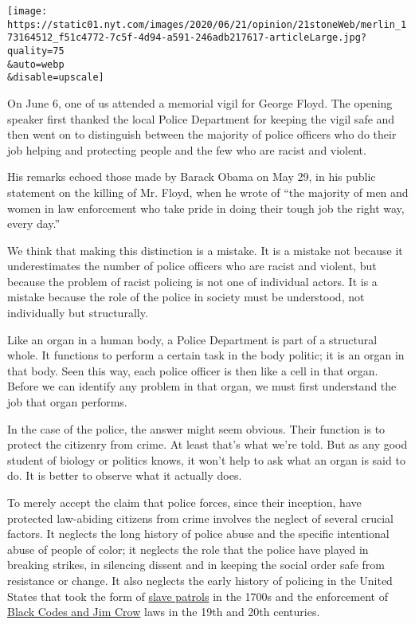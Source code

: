 \texttt{[image: https://static01.nyt.com/images/2020/06/21/opinion/21stoneWeb/merlin\_173164512\_f51c4772-7c5f-4d94-a591-246adb217617-articleLarge.jpg?quality=75\\\&auto=webp\\\&disable=upscale]}

On June 6, one of us attended a memorial vigil for George Floyd. The
opening speaker first thanked the local Police Department for keeping
the vigil safe and then went on to distinguish between the majority of
police officers who do their job helping and protecting people and the
few who are racist and violent.

His remarks echoed those made by Barack Obama on May 29, in his public
statement on the killing of Mr. Floyd, when he wrote of ``the majority
of men and women in law enforcement who take pride in doing their tough
job the right way, every day.''

We think that making this distinction is a mistake. It is a mistake not
because it underestimates the number of police officers who are racist
and violent, but because the problem of racist policing is not one of
individual actors. It is a mistake because the role of the police in
society must be understood, not individually but structurally.

Like an organ in a human body, a Police Department is part of a
structural whole. It functions to perform a certain task in the body
politic; it is an organ in that body. Seen this way, each police officer
is then like a cell in that organ. Before we can identify any problem in
that organ, we must first understand the job that organ performs.

In the case of the police, the answer might seem obvious. Their function
is to protect the citizenry from crime. At least that's what we're told.
But as any good student of biology or politics knows, it won't help to
ask what an organ is said to do. It is better to observe what it
actually does.

To merely accept the claim that police forces, since their inception,
have protected law-abiding citizens from crime involves the neglect of
several crucial factors. It neglects the long history of police abuse
and the specific intentional abuse of people of color; it neglects the
role that the police have played in breaking strikes, in silencing
dissent and in keeping the social order safe from resistance or change.
It also neglects the early history of policing in the United States that
took the form of
\href{https://lawenforcementmuseum.org/2019/07/10/slave-patrols-an-early-form-of-american-policing/}{slave
patrols} in the 1700s and the enforcement of
\href{https://www.nationalgeographic.org/encyclopedia/black-codes-and-jim-crow-laws/}{Black
Codes and Jim Crow} laws in the 19th and 20th centuries.

